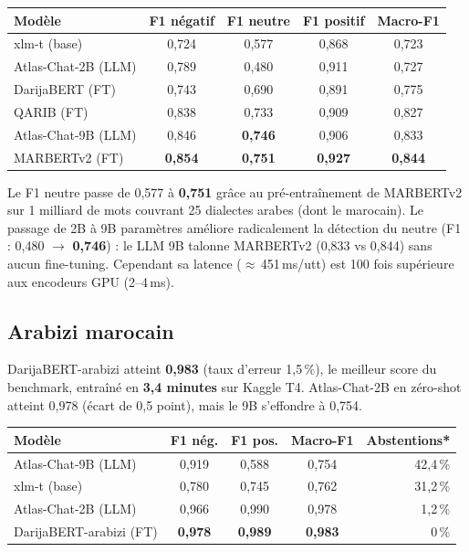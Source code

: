\documentclass[11pt, a4paper]{article}
\begin{document}
\vspace{4pt}
\begin{center}
\begin{tabular}{lcccc}
\toprule
\textbf{Modèle} & \textbf{F1 négatif} & \textbf{F1 neutre} & \textbf{F1 positif} & \textbf{Macro-F1} \\
\midrule
xlm-t (base)          & 0{,}724 & 0{,}577 & 0{,}868 & 0{,}723 \\
Atlas-Chat-2B (LLM)   & 0{,}789 & 0{,}480 & 0{,}911 & 0{,}727 \\
DarijaBERT (FT)       & 0{,}743 & 0{,}690 & 0{,}891 & 0{,}775 \\
QARIB (FT)            & 0{,}838 & 0{,}733 & 0{,}909 & 0{,}827 \\
Atlas-Chat-9B (LLM)   & 0{,}846 & \textbf{0{,}746} & 0{,}906 & 0{,}833 \\
MARBERTv2 (FT)        & \textbf{0{,}854} & \textbf{0{,}751} & \textbf{0{,}927} & \textbf{0{,}844} \\
\bottomrule
\end{tabular}
\end{center}

\vspace{2pt}
Le F1 neutre passe de 0{,}577 à \textbf{0{,}751} grâce au pré-entraînement
de MARBERTv2 sur 1 milliard de mots couvrant 25 dialectes arabes (dont le marocain).
Le passage de 2B à 9B paramètres améliore radicalement la détection du neutre
(F1 : 0{,}480 $\to$ \textbf{0{,}746}) : le LLM 9B talonne MARBERTv2 (0{,}833 vs 0{,}844)
sans aucun fine-tuning. Cependant sa latence ($\approx$\,451\,ms/utt) est 100 fois
supérieure aux encodeurs GPU (2--4\,ms).

\subsection{Arabizi marocain}

DarijaBERT-arabizi atteint \textbf{0{,}983} (taux d'erreur 1{,}5\,\%), le
meilleur score du benchmark, entraîné en \textbf{3,4 minutes} sur Kaggle T4.
Atlas-Chat-2B en zéro-shot atteint 0{,}978 (écart de 0{,}5 point), mais le 9B s'effondre à 0{,}754.

\vspace{4pt}
\begin{center}
\begin{tabular}{lcccr}
\toprule
\textbf{Modèle} & \textbf{F1 nég.} & \textbf{F1 pos.} & \textbf{Macro-F1} & \textbf{Abstentions*} \\
\midrule
\rowcolor{llmblue}
Atlas-Chat-9B (LLM)      & 0{,}919 & 0{,}588 & 0{,}754 & 42{,}4\,\% \\
xlm-t (base)             & 0{,}780 & 0{,}745 & 0{,}762 & 31{,}2\,\% \\
\rowcolor{llmblue}
Atlas-Chat-2B (LLM)      & 0{,}966 & 0{,}990 & 0{,}978 & 1{,}2\,\% \\
DarijaBERT-arabizi (FT)  & \textbf{0{,}978} & \textbf{0{,}989} & \textbf{0{,}983} & 0\,\% \\
\bottomrule
\end{tabular}
\end{center}
\end{document}
